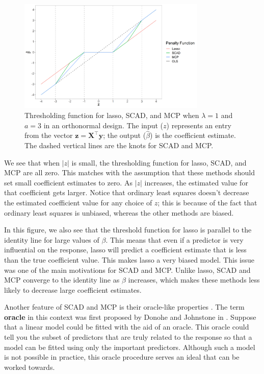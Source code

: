 \documentclass{article}
\begin{document}
	\begin{figure}[!h]
		\centering
		\includegraphics[width = 0.8\textwidth]{images/lasso-scad-mcp-solution.png}
		\captionsetup{width = 0.8\textwidth}
		\caption{Thresholding function for lasso, SCAD, and MCP when $\lambda = 1$ and $a = 3$ in an orthonormal design. The input ($z$) represents an entry from the vector $\mathbf{z}=\mathbf{X}^\top \mathbf{y}$; the output ($\hat{\beta}$) is the coefficient estimate. The dashed vertical lines are the knots for SCAD and MCP.}
		\label{fig:prediction}
	\end{figure}
	
	We see that when $\vert z \vert$ is small, the thresholding function for lasso, SCAD, and MCP are all zero. This matches with the assumption that these methods should set small coefficient estimates to zero. As $\vert z \vert$ increases, the estimated value for that coefficient gets larger. Notice that ordinary least squares doesn't decrease the estimated coefficient value for any choice of $z$; this is because of the fact that ordinary least squares is unbiased, whereas the other methods are biased.
	
	In this figure, we also see that the threshold function for lasso is parallel to the identity line for large values of $\beta$. This means that even if a predictor is very influential on the response, lasso will predict a coefficient estimate that is less than the true coefficient value. This makes lasso a very biased model. This issue was one of the main motivations for SCAD and MCP. Unlike lasso, SCAD and MCP converge to the identity line as $\beta$ increases, which makes these methods less likely to decrease large coefficient estimates.
	
	Another feature of SCAD and MCP is their oracle-like properties \cite{fan2001variable, zhang2010nearly}. The term \textbf{oracle} in this context was first proposed by Donohe and Johnstone in \cite{donoho1994ideal}. Suppose that a linear model could be fitted with the aid of an oracle. This oracle could tell you the subset of predictors that are truly related to the response so that a model can be fitted using only the important predictors. Although such a model is not possible in practice, this oracle procedure serves an ideal that can be worked towards.
	
\end{document}
